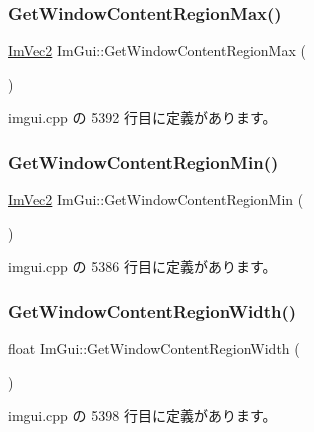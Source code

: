 \subsubsection{\texorpdfstring{Get\+Window\+Content\+Region\+Max()}{GetWindowContentRegionMax()}}
{\footnotesize\ttfamily \mbox{\hyperlink{struct_im_vec2}{Im\+Vec2}} Im\+Gui\+::\+Get\+Window\+Content\+Region\+Max (\begin{DoxyParamCaption}{ }\end{DoxyParamCaption})}



 imgui.\+cpp の 5392 行目に定義があります。

\mbox{\label{namespace_im_gui_a790123aa15c266798f35050ba36b7197}} 
\subsubsection{\texorpdfstring{Get\+Window\+Content\+Region\+Min()}{GetWindowContentRegionMin()}}
{\footnotesize\ttfamily \mbox{\hyperlink{struct_im_vec2}{Im\+Vec2}} Im\+Gui\+::\+Get\+Window\+Content\+Region\+Min (\begin{DoxyParamCaption}{ }\end{DoxyParamCaption})}



 imgui.\+cpp の 5386 行目に定義があります。

\mbox{\label{namespace_im_gui_a87c1de99e670bff87c43bfb07bbf898f}} 
\subsubsection{\texorpdfstring{Get\+Window\+Content\+Region\+Width()}{GetWindowContentRegionWidth()}}
{\footnotesize\ttfamily float Im\+Gui\+::\+Get\+Window\+Content\+Region\+Width (\begin{DoxyParamCaption}{ }\end{DoxyParamCaption})}



 imgui.\+cpp の 5398 行目に定義があります。

